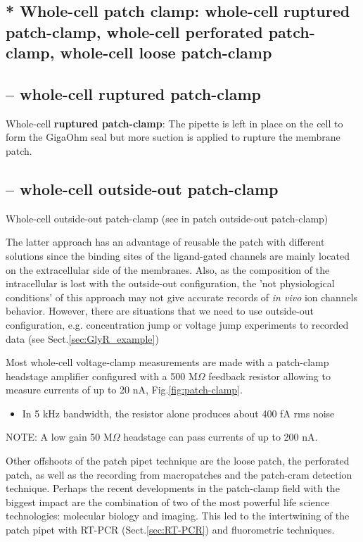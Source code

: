 \subsection{* Whole-cell patch clamp: whole-cell ruptured patch-clamp,
whole-cell perforated patch-clamp, whole-cell loose patch-clamp}
\label{sec:patch-clamp-whole-cell}



\subsection{-- whole-cell ruptured patch-clamp}
\label{sec:whole-cell-patch-clamp-Giga-Ohm}

Whole-cell {\bf ruptured patch-clamp}: The pipette is left in place on
the cell to form the GigaOhm seal but more suction is applied to rupture the membrane
patch.

\subsection{-- whole-cell outside-out patch-clamp}

Whole-cell outside-out patch-clamp (see in patch outside-out
patch-clamp)

The latter approach has an advantage of reusable the patch with different
solutions since the binding sites of the ligand-gated channels are mainly
located on the extracellular side of the membranes.
Also, as the composition of the intracellular is lost with the outside-out
configuration, the 'not physiological conditions' of this approach may not give
accurate records of {\it in vivo} ion channels behavior.
However, there are situations that we need to use outside-out configuration,
e.g. concentration jump or voltage jump experiments to recorded data (see
Sect.\ref{sec:GlyR_example})

Most whole-cell voltage-clamp measurements are made with a patch-clamp headstage
amplifier configured with a 500 M$\Omega$ feedback resistor allowing to measure
currents of up to 20 nA, Fig.\ref{fig:patch-clamp}.
\begin{itemize}
  \item In 5 kHz bandwidth, the resistor alone produces about 400 fA rms noise
\end{itemize}
NOTE: A low gain 50 M$\Omega$ headstage can pass currents of up to 200 nA.

Other offshoots of the patch pipet technique are the loose patch, the perforated
patch, as well as the recording from macropatches and the patch-cram detection
technique. Perhaps the recent developments in the patch-clamp field with the
biggest impact are the combination of two of the most powerful life science
technologies: molecular biology and imaging. This led to the intertwining of the
patch pipet with RT-PCR (Sect.\ref{sec:RT-PCR}) and fluorometric techniques.

